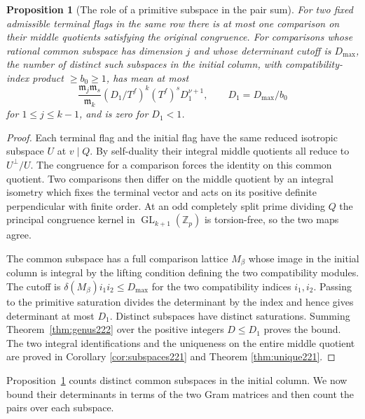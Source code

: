 \documentclass[a4paper,11pt]{article}
\newtheorem{proposition}{Proposition}[section]
\theoremstyle{definition}
\theoremstyle{remark}
\newcommand{\ZZ}{\mathbb Z}\newcommand{\ord}{\operatorname{ord}}
\numberwithin{equation}{section}
\begin{document}
\begin{proposition}[The role of a primitive subspace in the pair sum]
\label{prop:comparison222}
For two fixed admissible terminal flags in the same row there
is at most one comparison on their middle quotients satisfying
the original congruence. For comparisons whose rational
common subspace has dimension \(j\) and whose determinant
cutoff is \(D_{\max}\), the number of distinct such subspaces
in the initial column, with compatibility-index product
\(\ge b_0\ge1\), has mean at most
\[
    \frac{\mathfrak m_j\mathfrak m_s}{\mathfrak m_k}
       (D_1/T^f)^k (T^f)^s D_1^{\nu+1},
                    \qquad D_1=D_{\max}/b_0
\]
for \(1\le j\le k-1\), and is zero for \(D_1<1\).
\end{proposition}
\begin{proof}
Each terminal flag and the initial flag have the same
reduced isotropic subspace \(U\) at \(v\mid Q\). By
self-duality their integral middle quotients all reduce to
\(U^\perp/U\). The congruence for a comparison forces the
identity on this common quotient. Two comparisons then
differ on the middle quotient by an integral isometry which
fixes the terminal vector and acts on its positive definite
perpendicular with finite order. At an odd completely split
prime dividing \(Q\) the principal congruence kernel in
\(\operatorname{GL}_{k+1}(\ZZ_p)\) is torsion-free, so the two maps agree.

The common subspace has a full comparison lattice \(M_\beta\)
whose image in the initial column is integral by the lifting
condition defining the two compatibility modules. The
cutoff is \(\delta(M_\beta)i_1i_2\le D_{\max}\) for the two
compatibility indices \(i_1,i_2\). Passing to the primitive
saturation divides the determinant by the index and hence
gives determinant at most \(D_1\). Distinct subspaces have
distinct saturations. Summing Theorem~\ref{thm:genus222}
over the positive integers \(D\le D_1\) proves the bound.
The two integral identifications and the uniqueness on the
entire middle quotient are proved in
Corollary \ref{cor:subspaces221} and Theorem \ref{thm:unique221}.
\end{proof}

Proposition~\ref{prop:comparison222} counts distinct common subspaces in the initial column. We now bound their determinants in terms of the two Gram matrices and then count the pairs over each subspace.
\end{document}
